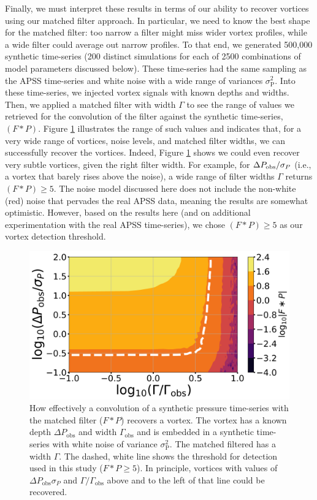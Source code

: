 \documentclass{aastex63}
\begin{document}
Finally, we must interpret these results in terms of our ability to recover vortices using our matched filter approach. In particular, we need to know the best shape for the matched filter: too narrow a filter might miss wider vortex profiles, while a wide filter could average out narrow profiles. To that end, we generated 500,000 synthetic time-series (200 distinct simulations for each of 2500 combinations of model parameters discussed below). These time-series had the same sampling as the APSS time-series and white noise with a wide range of variances $\sigma_\text{P}^2$. Into these time-series, we injected vortex signals with known depths and widths. Then, we applied a matched filter with width $\Gamma$ to see the range of values we retrieved for the convolution of the filter against the synthetic time-series, $\left( F \ast P \right)$. Figure \ref{fig:vortex_recovery} illustrates the range of such values and indicates that, for a very wide range of vortices, noise levels, and matched filter widths, we can successfully recover the vortices. Indeed, Figure \ref{fig:vortex_recovery} shows we could even recover very subtle vortices, given the right filter width. For example, for $\Delta P_{\rm obs}/\sigma_P$ (i.e., a vortex that barely rises above the noise), a wide range of filter widths $\Gamma$ returns $\left( F \ast P \right) \geq 5 $. The noise model discussed here does not include the non-white (red) noise that pervades the real APSS data, meaning the results are somewhat optimistic. However, based on the results here (and on additional experimentation with the real APSS time-series), we chose $\left( F \ast P \right) \geq 5 $ as our vortex detection threshold.

\begin{figure}
    \centering
    \includegraphics[width=\textwidth]{figures/vortex_recovery.png}
    \caption{How effectively a convolution of a synthetic pressure time-series with the matched filter ($F \ast P$) recovers a vortex. The vortex has a known depth $\Delta P_\text{obs}$ and width $\Gamma_\text{obs}$ and is embedded in a synthetic time-series with white noise of variance $\sigma_\text{P}^2$. The matched filtered has a width $\Gamma$. The dashed, white line shows the threshold for detection used in this study ($F \ast P \geq 5$). In principle, vortices with values of $\Delta P_\text{obs}\sigma_P$ and $\Gamma/\Gamma_\text{obs}$ above and to the left of that line could be recovered.}
    \label{fig:vortex_recovery}
\end{figure}
\end{document}
